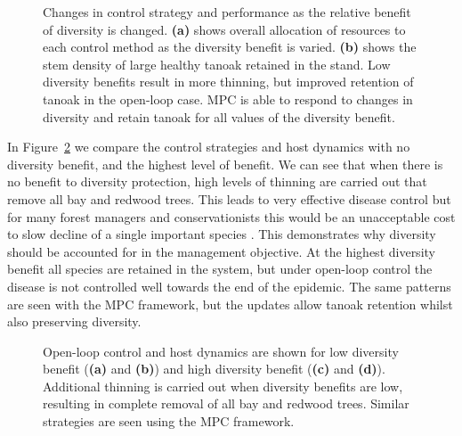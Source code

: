 \begin{figure}[t]
    \begin{center}
        \caption[Varying the diversity benefits]{Changes in control strategy and performance as the relative benefit of diversity is changed. \textbf{(a)} shows overall allocation of resources to each control method as the diversity benefit is varied. \textbf{(b)} shows the stem density of large healthy tanoak retained in the stand. Low diversity benefits result in more thinning, but improved retention of tanoak in the open-loop case. MPC is able to respond to changes in diversity and retain tanoak for all values of the diversity benefit.\label{fig:ch6:div_scan}}
    \end{center}
\end{figure}

In Figure~\ref{fig:ch6:div_compare} we compare the control strategies and host dynamics with no diversity benefit, and the highest level of benefit. We can see that when there is no benefit to diversity protection, high levels of thinning are carried out that remove all bay and redwood trees. This leads to very effective disease control but for many forest managers and conservationists this would be an unacceptable cost to slow decline of a single important species \citet{noss_redwood_2000}. This demonstrates why diversity should be accounted for in the management objective. At the highest diversity benefit all species are retained in the system, but under open-loop control the disease is not controlled well towards the end of the epidemic. The same patterns are seen with the MPC framework, but the updates allow tanoak retention whilst also preserving diversity.

\begin{figure}[H]
    \begin{center}
        \caption[Host dynamics when varying the diversity benefits]{Open-loop control and host dynamics are shown for low diversity benefit (\textbf{(a)} and \textbf{(b)}) and high diversity benefit (\textbf{(c)} and \textbf{(d)}). Additional thinning is carried out when diversity benefits are low, resulting in complete removal of all bay and redwood trees. Similar strategies are seen using the MPC framework.\label{fig:ch6:div_compare}}
    \end{center}
\end{figure}

